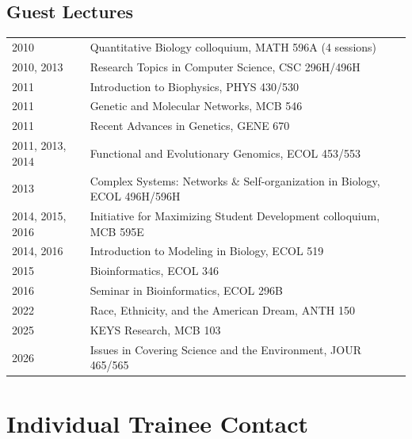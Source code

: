 \documentclass[11pt]{article}
\begin{document}
\subsection*{Guest Lectures}
\begin{longtable}[l]{l l}
2010 & Quantitative Biology colloquium, MATH 596A (4 sessions)\\
2010, 2013 & Research Topics in Computer Science, CSC 296H/496H\\
2011 & Introduction to Biophysics, PHYS 430/530\\
2011 & Genetic and Molecular Networks, MCB 546\\
2011 & Recent Advances in Genetics, GENE 670\\
2011, 2013, 2014 & Functional and Evolutionary Genomics, ECOL 453/553\\
2013 & Complex Systems: Networks \& Self-organization in Biology, ECOL 496H/596H\\
2014, 2015, 2016 & Initiative for Maximizing Student Development colloquium, MCB 595E\\
2014, 2016 & Introduction to Modeling in Biology, ECOL 519\\
2015 & Bioinformatics, ECOL 346\\
2016 & Seminar in Bioinformatics, ECOL 296B\\
2022 & Race, Ethnicity, and the American Dream, ANTH 150\\
2025 & KEYS Research, MCB 103\\
2026 & Issues in Covering Science and the Environment, JOUR 465/565\\
\end{longtable}

\section*{Individual Trainee Contact}
\end{document}

